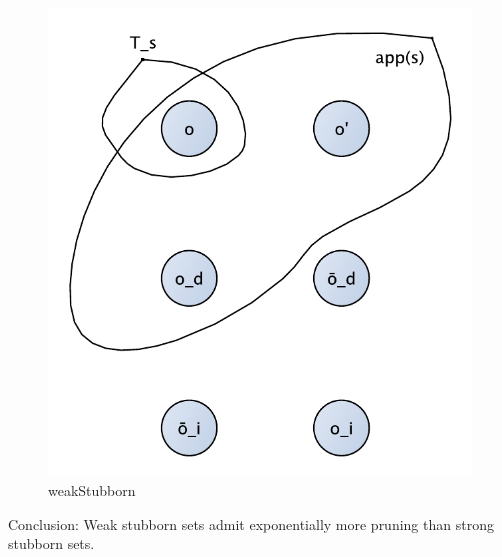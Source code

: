 \documentclass[11pt,a4paper]{article}
\begin{document}
\begin{figure}[h!]
\centering
\includegraphics[scale=0.4]{weakStubborn}
\caption{weakStubborn}
\end{figure}

Conclusion: Weak stubborn sets admit exponentially more pruning than strong stubborn sets.

\label{lastpage}
\end{document}
